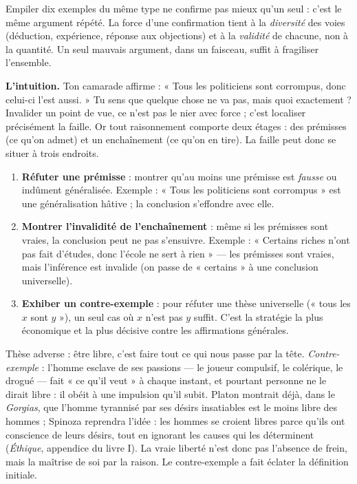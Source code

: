 \documentclass[11pt]{article}
\newcommand{\cle}[1]{{\popxbold\color{popdark}#1}}
\newcounter{popsec}
\newcounter{popsub}
\newcommand{\courssub}[1]{%
  \stepcounter{popsub}%
  \par\vspace{9pt}\noindent{\popxbold\fontsize{11.5}{13}\selectfont\color{popink}{\color{poporange}\thepopsec.\thepopsub}\hspace{6pt}#1}\par\nopagebreak\vspace{4pt}
}
\begin{document}
\begin{attention}
Empiler dix exemples du même type ne confirme pas mieux qu'un seul : c'est le même argument répété. La force d'une confirmation tient à la \emph{diversité} des voies (déduction, expérience, réponse aux objections) et à la \emph{validité} de chacune, non à la quantité. Un seul mauvais argument, dans un faisceau, suffit à fragiliser l'ensemble.
\end{attention}

\courssub{Invalider un point de vue : les trois stratégies}

\textbf{L'intuition.} Ton camarade affirme : « Tous les politiciens sont corrompus, donc celui-ci l'est aussi. » Tu sens que quelque chose ne va pas, mais quoi exactement ? Invalider un point de vue, ce n'est pas le nier avec force ; c'est localiser précisément la faille. Or tout raisonnement comporte deux étages : des \cle{prémisses} (ce qu'on admet) et un \cle{enchaînement} (ce qu'on en tire). La faille peut donc se situer à trois endroits.

\begin{methode}
\begin{enumerate}
\item \textbf{Réfuter une prémisse} : montrer qu'au moins une prémisse est \emph{fausse} ou indûment généralisée. Exemple : « Tous les politiciens sont corrompus » est une généralisation hâtive ; la conclusion s'effondre avec elle.
\item \textbf{Montrer l'invalidité de l'enchaînement} : même si les prémisses sont vraies, la conclusion peut ne pas s'ensuivre. Exemple : « Certains riches n'ont pas fait d'études, donc l'école ne sert à rien » — les prémisses sont vraies, mais l'inférence est invalide (on passe de « certains » à une conclusion universelle).
\item \textbf{Exhiber un contre-exemple} : pour réfuter une thèse universelle (« tous les $x$ sont $y$ »), un seul cas où $x$ n'est pas $y$ suffit. C'est la stratégie la plus économique et la plus décisive contre les affirmations générales.
\end{enumerate}
\end{methode}

\begin{exemplebox}
Thèse adverse : être libre, c'est faire tout ce qui nous passe par la tête. \emph{Contre-exemple} : l'homme esclave de ses passions — le joueur compulsif, le colérique, le drogué — fait « ce qu'il veut » à chaque instant, et pourtant personne ne le dirait libre : il obéit à une impulsion qu'il subit. Platon montrait déjà, dans le \emph{Gorgias}, que l'homme tyrannisé par ses désirs insatiables est le moins libre des hommes ; Spinoza reprendra l'idée : les hommes se croient libres parce qu'ils ont conscience de leurs désirs, tout en ignorant les causes qui les déterminent (\emph{Éthique}, appendice du livre I). La vraie liberté n'est donc pas l'absence de frein, mais la maîtrise de soi par la raison. Le contre-exemple a fait éclater la définition initiale.
\end{exemplebox}
\end{document}
